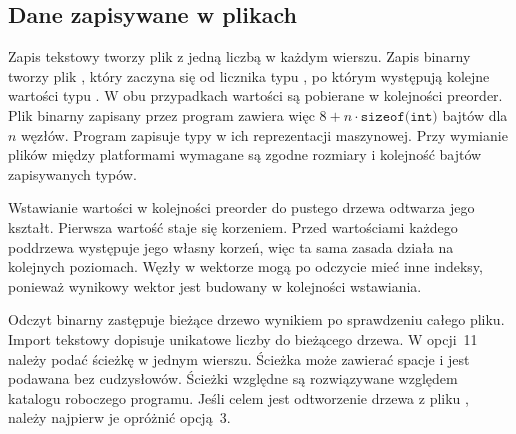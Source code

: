 \subsection{Dane zapisywane w plikach}
\label{sec:formaty}

Zapis tekstowy tworzy plik  z jedną liczbą w każdym
wierszu. Zapis binarny tworzy plik , który zaczyna się
od licznika typu , po którym występują kolejne
wartości typu . W obu przypadkach wartości są pobierane
w kolejności preorder. Plik binarny zapisany przez program zawiera
więc $8 + n \cdot \texttt{sizeof(int)}$ bajtów dla $n$ węzłów.
Program zapisuje typy w ich reprezentacji maszynowej. Przy wymianie
plików między platformami wymagane są zgodne rozmiary i kolejność
bajtów zapisywanych typów.

Wstawianie wartości w kolejności preorder do pustego drzewa
odtwarza jego kształt. Pierwsza wartość staje się korzeniem.
Przed wartościami każdego poddrzewa występuje jego własny korzeń,
więc ta sama zasada działa na kolejnych poziomach. Węzły w wektorze
mogą po odczycie mieć inne indeksy, ponieważ wynikowy wektor jest
budowany w kolejności wstawiania.

Odczyt binarny zastępuje bieżące drzewo wynikiem po sprawdzeniu
całego pliku. Import tekstowy dopisuje unikatowe liczby do
bieżącego drzewa. W opcji~11 należy podać ścieżkę w jednym
wierszu. Ścieżka może zawierać spacje i jest podawana bez
cudzysłowów. Ścieżki względne są rozwiązywane względem katalogu
roboczego programu. Jeśli celem jest odtworzenie drzewa z pliku
, należy najpierw je opróżnić opcją~3.

